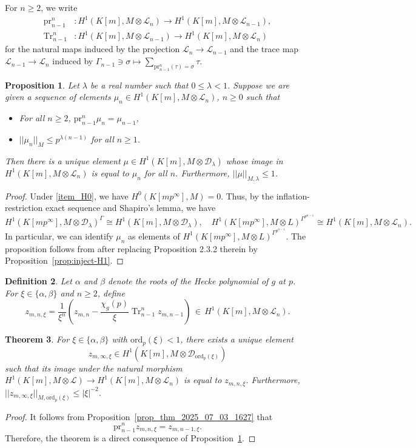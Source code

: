 \documentclass{amsart}
\numberwithin{equation}{section}
\newtheorem{theorem}{Theorem}[section]
\newtheorem{proposition}[theorem]{Proposition}
\newtheorem{defn}[theorem]{Definition}
\newcommand{\pr}{\mathrm{pr}}
\newcommand{\Tr}{\operatorname{Tr}}
\newcommand{\ord}{\mathrm{ord}}
\newcommand{\cD}{\mathcal{D}}
\newcommand{\sL}{\mathscr{L}}
\begin{document}
For $n\ge2$, we write 
\begin{align*}
    \pr^n_{n-1}&:H^1({K[m]},M\otimes\sL_n)\rightarrow H^1({K[m]},M\otimes\sL_{n-1}),\\
    \Tr^n_{n-1}&:H^1({K[m]},M\otimes\sL_{n-1})\rightarrow H^1({K[m]},M\otimes\sL_{n})
\end{align*}
for the natural maps induced by the projection $\sL_n\rightarrow \sL_{n-1}$ and the trace map $\sL_{n-1}\rightarrow\sL_{n}$ induced by $\Gamma_{n-1}\ni\sigma\mapsto \displaystyle\sum_{\pr^n_{n-1}(\tau)=\sigma}\tau$. 
\begin{proposition}\label{prop:exist-H1}
    Let $\lambda$ be a real number such that $0\le \lambda<1$. Suppose we are given a sequence of elements $\mu_n\in H^1(K[m],M\otimes \sL_n)$, $n\ge0$ such that
    \begin{itemize}
        \item[i)] For all $n\ge2$, $\pr^{n}_{n-1}\mu_{n}=\mu_{n-1}$,
        \item[ii)] $||\mu_n||_M\le p^{ \lambda (n-1)}$ for all $n\ge1$.
    \end{itemize}
    Then there is a unique element $\mu\in H^1(K[m],M\otimes \cD_{\lambda})$ whose image in $H^1(K[m],M\otimes \sL_{n})$ is equal to $\mu_n$ for all $n$. Furthermore, $||\mu||_{M,\lambda}\le1$.
\end{proposition}
\begin{proof}
Under \eqref{item_H0}, we have $H^0(K[mp^\infty],M)=0$. Thus, by the inflation-restriction exact sequence and Shapiro's lemma, we have 
\[
H^1(K[mp^\infty],M\otimes \cD_{\lambda})^\Gamma\cong H^1(K[m],M\otimes \cD_{\lambda}),\quad H^1(K[mp^\infty],M\otimes L)^{\Gamma^{p^{n-1}}}\cong H^1(K[m],M\otimes \sL_{n}).
\]
In particular, we can identify $\mu_n$ as elements of
   $H^1(K[mp^\infty],M\otimes L)^{\Gamma^{p^{n-1}}}$. The proposition follows from \cite[proof of Proposition~2.3.3]{LZ1} after replacing Proposition 2.3.2 therein by Proposition~\ref{prop:inject-H1}.
\end{proof}


\begin{defn}
\label{def_2025_10_15_1649}
Let $\alpha$ and $\beta$ denote the roots of the Hecke polynomial of $g$ at $p$.
 For $\xi\in\{\alpha,\beta\}$ and $n\ge2$, define 
 \[z_{m,n,\xi}=\frac{1}{\xi^{n}}\left(z_{m,n}-\frac{\chi_g(p)}{\xi}\Tr_{n-1}^nz_{m,n-1}\right) \,\in\, H^1(K[m], M\otimes\sL_n).\]
\end{defn}

\begin{theorem}\label{thm:non-integral-classes}
    For $\xi\in\{\alpha,\beta\}$ with $\ord_p(\xi)<1$, there exists a unique element $$z_{m,\infty,\xi}\in H^1(K[m],M\otimes\cD_{\ord_p(\xi)})$$ such that its image under the natural morphism $
    H^1(K[m],M\otimes\sL)\longrightarrow H^1(K[m],M\otimes\sL_n)$ is equal to $z_{m,n,\xi}$. Furthermore, $||z_{m,\infty,\xi}||_{M,\ord_p(\xi)}\le |\xi|^{-2}$. 
\end{theorem}
\begin{proof}
    It follows from Proposition~\ref{prop_thm_2025_07_03_1627} that 
\[
\pr_{n-1}^nz_{m,n,\xi}=z_{m,n-1,\xi}.
\]
Therefore, the theorem is a direct consequence of Proposition~\ref{prop:exist-H1}. 
\end{proof}
\end{document}
